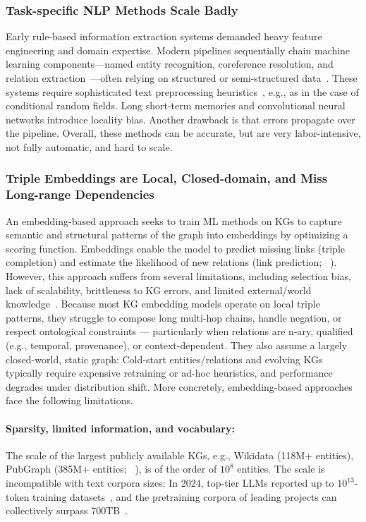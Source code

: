 \documentclass[10pt]{article}
\begin{document}
\subsubsection{Task-specific NLP Methods Scale Badly}
\label{subsubsec:nlp_methods}
Early rule-based information extraction systems demanded heavy feature engineering and domain expertise. Modern pipelines sequentially chain machine learning components---named entity recognition, coreference resolution, and relation extraction~\cite{Jaradeh2023}---often relying on structured or semi-structured data~\cite{info15080509}. These systems require sophisticated text preprocessing heuristics~\cite{brissette2024LLMKG}, e.g., as in the case of conditional random fields. Long short-term memories and convolutional neural networks introduce locality bias. Another drawback is that errors propagate over the pipeline. Overall, these methods can be accurate, but are very labor-intensive, not fully automatic, and hard to scale. 

\subsubsection{Triple Embeddings are Local, Closed-domain, and Miss Long-range Dependencies}
\label{subsubsec:triple_embeddings}
An embedding-based approach seeks to train ML methods on KGs to capture semantic and structural patterns of the graph into embeddings by optimizing a scoring function. Embeddings enable the model to predict missing links (triple completion) and estimate the likelihood of new relations (link prediction; ~\citealt{ns_methods_kg_reasoning}). However, this approach suffers from several limitations, including selection bias, lack of scalability, brittleness to KG errors, and limited external/world knowledge~\cite{reasoning_over_kg_with_logic_2025}. Because most KG embedding models operate on local triple patterns, they struggle to compose long multi-hop chains, handle negation, or respect ontological constraints --- particularly when relations are n-ary, qualified (e.g., temporal, provenance), or context-dependent. They also assume a largely closed-world, static graph: Cold-start entities/relations and evolving KGs typically require expensive retraining or ad-hoc heuristics, and performance degrades under distribution shift. More concretely, embedding-based approaches face the following limitations.

\paragraph{Sparsity, limited information, and vocabulary:} The scale of the largest publicly available KGs, e.g., Wikidata (118M+ entities), PubGraph (385M+ entities; ~\citealt{ahrabian2023pubgraph}), is of the order of $10^8$ entities. The scale is incompatible with text corpora sizes: In 2024, top-tier LLMs reported up to $10^{13}$-token training datasets~\cite{position_data_scale}, and the pretraining corpora of leading projects can collectively surpass 700TB~\cite{liu2024datasetslargelanguagemodels}.
\end{document}

